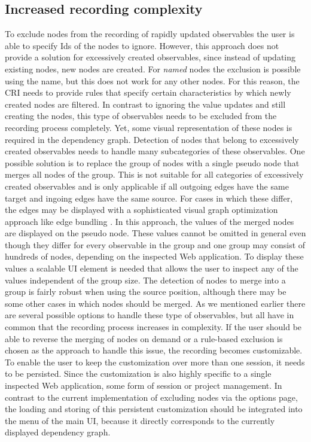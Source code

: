 \subsection{Increased recording complexity}
To exclude nodes from the recording of rapidly updated observables the user is able to specify Ids of the nodes to ignore. However, this approach does not provide a solution for excessively created observables, since instead of updating existing nodes, new nodes are created. For \emph{named} nodes the exclusion is possible using the name, but this does not work for any other nodes. For this reason, the CRI needs to provide rules that specify certain characteristics by which newly created nodes are filtered. In contrast to ignoring the value updates and still creating the nodes, this type of observables needs to be excluded from the recording process completely. Yet, some visual representation of these nodes is required in the dependency graph. Detection of nodes that belong to excessively created observables needs to handle many subcategories of these observables. One possible solution is to replace the group of nodes with a single pseudo node that merges all nodes of the group. This is not suitable for all categories of excessively created observables and is only applicable if all outgoing edges have the same target and ingoing edges have the same source. For cases in which these differ, the edges may be displayed with a sophisticated visual graph optimization approach like edge bundling \cite{EdgeBundling}. In this approach, the values of the merged nodes are displayed on the pseudo node. These values cannot be omitted in general even though they differ for every observable in the group and one group may consist of hundreds of nodes, depending on the inspected Web application. To display these values a scalable UI element is needed that allows the user to inspect any of the values independent of the group size. The detection of nodes to merge into a group is fairly robust when using the source position, although there may be some other cases in which nodes should be merged. As we mentioned earlier there are several possible options to handle these type of observables, but all have in common that the recording process increases in complexity. If the user should be able to reverse the merging of nodes on demand or a rule-based exclusion is chosen as the approach to handle this issue, the recording becomes customizable. To enable the user to keep the customization over more than one session, it needs to be persisted. Since the customization is also highly specific to a single inspected Web application, some form of session or project management. In contrast to the current implementation of excluding nodes via the options page, the loading and storing of this persistent customization should be integrated into the menu of the main UI, because it directly corresponds to the currently displayed dependency graph.
	
